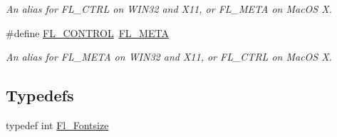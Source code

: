 \begin{Indent}
\begin{DoxyCompactItemize}
$$\begin{DoxyCompactList}\small\item\em An alias for F\+L\+\_\+\+C\+T\+RL on W\+I\+N32 and X11, or F\+L\+\_\+\+M\+E\+TA on Mac\+OS X. \end{DoxyCompactList}\item 
\#define \hyperlink{_enumerations_8_h_a25fe41b1bd340d52f7970051d8b680bc}{F\+L\+\_\+\+C\+O\+N\+T\+R\+OL}~\hyperlink{_enumerations_8_h_a2c50b1b00111f992d5d49f07c9cee22a}{F\+L\+\_\+\+M\+E\+TA}
\begin{DoxyCompactList}\small\item\em An alias for F\+L\+\_\+\+M\+E\+TA on W\+I\+N32 and X11, or F\+L\+\_\+\+C\+T\+RL on Mac\+OS X. \end{DoxyCompactList}\end{DoxyCompactItemize}
\end{Indent}
\subsection*{Typedefs}
\begin{DoxyCompactItemize}
\item 
typedef int \hyperlink{_enumerations_8_h_ad58927f5c691454480f7cd28362502f1}{Fl\+\_\+\+Fontsize}
\end{DoxyCompactItemize}
